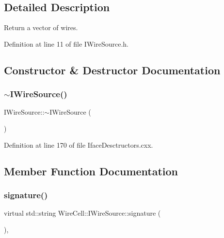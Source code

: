 \subsection{Detailed Description}
Return a vector of wires. 

Definition at line 11 of file I\+Wire\+Source.\+h.



\subsection{Constructor \& Destructor Documentation}
\mbox{\label{class_wire_cell_1_1_i_wire_source_ae5c3b797b4566cbfd35ea45c86c7e339}} 
\subsubsection{\texorpdfstring{$\sim$\+I\+Wire\+Source()}{~IWireSource()}}
{\footnotesize\ttfamily I\+Wire\+Source\+::$\sim$\+I\+Wire\+Source (\begin{DoxyParamCaption}{ }\end{DoxyParamCaption})\hspace{0.3cm}{\ttfamily [virtual]}}



Definition at line 170 of file Iface\+Desctructors.\+cxx.



\subsection{Member Function Documentation}
\mbox{\label{class_wire_cell_1_1_i_wire_source_ad72fdd8f8e747a7ea5707fb5b0eef594}} 
\subsubsection{\texorpdfstring{signature()}{signature()}}
{\footnotesize\ttfamily virtual std\+::string Wire\+Cell\+::\+I\+Wire\+Source\+::signature (\begin{DoxyParamCaption}{ }\end{DoxyParamCaption})\hspace{0.3cm}{\ttfamily [inline]}, {\ttfamily [virtual]}}



